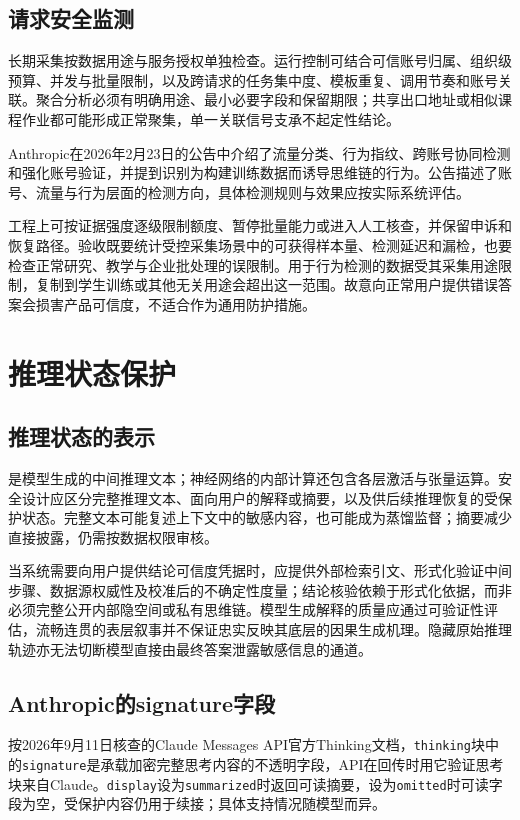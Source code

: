 \documentclass[../textbook.tex]{subfiles}
\begin{document}
\subsection{请求安全监测}
长期采集按数据用途与服务授权单独检查。运行控制可结合可信账号归属、组织级预算、并发与批量限制，以及跨请求的任务集中度、模板重复、调用节奏和账号关联。聚合分析必须有明确用途、最小必要字段和保留期限；共享出口地址或相似课程作业都可能形成正常聚集，单一关联信号支承不起定性结论。

Anthropic在2026年2月23日的公告中介绍了流量分类、行为指纹、跨账号协同检测和强化账号验证，并提到识别为构建训练数据而诱导思维链的行为\cite{anthropic2026distillationdefense}。公告描述了账号、流量与行为层面的检测方向，具体检测规则与效果应按实际系统评估。

工程上可按证据强度逐级限制额度、暂停批量能力或进入人工核查，并保留申诉和恢复路径。验收既要统计受控采集场景中的可获得样本量、检测延迟和漏检，也要检查正常研究、教学与企业批处理的误限制。用于行为检测的数据受其采集用途限制，复制到学生训练或其他无关用途会超出这一范围。故意向正常用户提供错误答案会损害产品可信度，不适合作为通用防护措施。

\section{推理状态保护}

\subsection{推理状态的表示}
是模型生成的中间推理文本；神经网络的内部计算还包含各层激活与张量运算。安全设计应区分完整推理文本、面向用户的解释或摘要，以及供后续推理恢复的受保护状态。完整文本可能复述上下文中的敏感内容，也可能成为蒸馏监督；摘要减少直接披露，仍需按数据权限审核。

当系统需要向用户提供结论可信度凭据时，应提供外部检索引文、形式化验证中间步骤、数据源权威性及校准后的不确定性度量；结论核验依赖于形式化依据，而非必须完整公开内部隐空间或私有思维链。模型生成解释的质量应通过可验证性评估，流畅连贯的表层叙事并不保证忠实反映其底层的因果生成机理。隐藏原始推理轨迹亦无法切断模型直接由最终答案泄露敏感信息的通道。

\subsection{Anthropic的signature字段}
按2026年9月11日核查的Claude Messages API官方Thinking文档，\texttt{thinking}块中的\texttt{signature}是承载加密完整思考内容的不透明字段，API在回传时用它验证思考块来自Claude。\texttt{display}设为\texttt{summarized}时返回可读摘要，设为\texttt{omitted}时可读字段为空，受保护内容仍用于续接；具体支持情况随模型而异\cite{anthropic2026thinking}。
\end{document}
